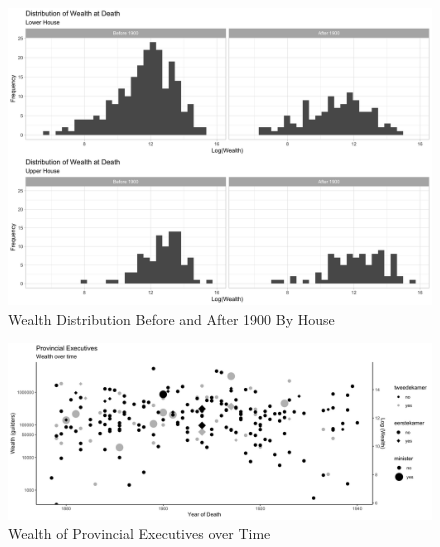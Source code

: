 \begin{landscape}
\begin{figure}
    \centering
    \includegraphics[scale=0.15]{figures/Histogram_wealth_per_parl.png}
    \caption{Wealth Distribution Before and After 1900 By House}
    \label{fig:histogram}
\end{figure}
\end{landscape}
\clearpage


\clearpage



\clearpage

\begin{landscape}

\clearpage


\begin{figure}
    \centering
    \includegraphics[scale = 0.17]{figures/wealth_dep.png}
    \caption{Wealth of Provincial Executives over Time}
    \label{fig:avgwealthprovexec}
\end{figure}
\clearpage
\end{landscape}




